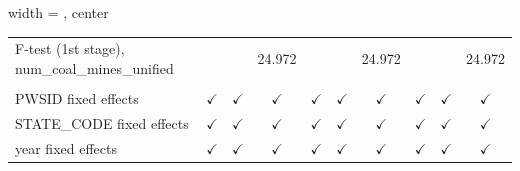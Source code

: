 \begin{table}[htbp]
\begin{adjustbox}{width = \textwidth, center}
\begin{tabular}{lccccccccc}
         F-test (1st stage), num\_coal\_mines\_unified    &                      &                & 24.972        &               &               & 24.972        &               &                & 24.972\\  
          \\
         PWSID fixed effects                              & $\checkmark$         & $\checkmark$   & $\checkmark$  & $\checkmark$  & $\checkmark$  & $\checkmark$  & $\checkmark$  & $\checkmark$   & $\checkmark$\\   
         STATE\_CODE fixed effects                        & $\checkmark$         & $\checkmark$   & $\checkmark$  & $\checkmark$  & $\checkmark$  & $\checkmark$  & $\checkmark$  & $\checkmark$   & $\checkmark$\\   
         year fixed effects                               & $\checkmark$         & $\checkmark$   & $\checkmark$  & $\checkmark$  & $\checkmark$  & $\checkmark$  & $\checkmark$  & $\checkmark$   & $\checkmark$\\   
         \bottomrule
      \end{tabular}
   \end{adjustbox}
\end{table}


